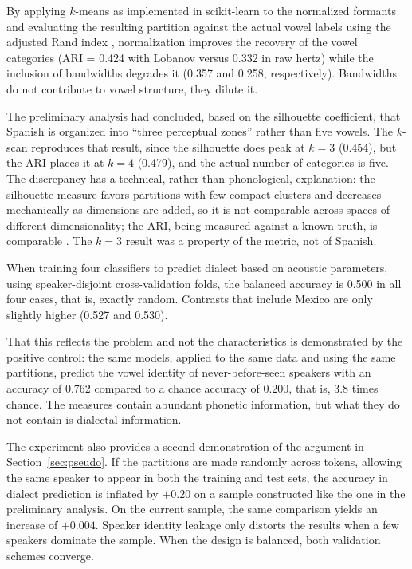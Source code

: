 \documentclass[11pt]{article}
\begin{document}
By applying $k$-means as implemented in scikit-learn \citep{pedregosa2011} to the
normalized formants and evaluating the resulting partition against the actual
vowel labels using the adjusted Rand index \citep{hubert1985}, normalization
improves the recovery of the vowel categories (ARI = 0.424 with Lobanov versus
0.332 in raw hertz) while the inclusion of bandwidths degrades it (0.357 and
0.258, respectively). Bandwidths do not contribute to vowel structure, they
dilute it.

The preliminary analysis had concluded, based on the silhouette coefficient, that
Spanish is organized into ``three perceptual zones'' rather than five vowels. The
$k$-scan reproduces that result, since the silhouette does peak at $k = 3$
(0.454), but the ARI places it at $k = 4$ (0.479), and the actual number of
categories is five. The discrepancy has a technical, rather than phonological, explanation:
the silhouette measure favors partitions with few compact clusters and decreases
mechanically as dimensions are added, so it is not comparable across spaces of
different dimensionality; the ARI, being measured against a known truth, is
comparable \citep{rousseeuw1987}. The $k = 3$ result was a property of the metric,
not of Spanish.

When training four classifiers to predict dialect based on acoustic parameters,
using speaker-disjoint cross-validation folds, the balanced accuracy is 0.500 in
all four cases, that is, exactly random. Contrasts that include Mexico are only
slightly higher (0.527 and 0.530).

That this reflects the problem and not the characteristics is demonstrated by the
positive control: the same models, applied to the same data and using the same
partitions, predict the vowel identity of never-before-seen speakers with an
accuracy of 0.762 compared to a chance accuracy of 0.200, that is, 3.8 times
chance. The measures contain abundant phonetic information, but what they do not
contain is dialectal information.

The experiment also provides a second demonstration of the argument in
Section~\ref{sec:pseudo}. If the partitions are made randomly across tokens,
allowing the same speaker to appear in both the training and test sets, the
accuracy in dialect prediction is inflated by $+0.20$ on a sample constructed
like the one in the preliminary analysis. On the current sample, the same
comparison yields an increase of $+0.004$. Speaker identity leakage only distorts
the results when a few speakers dominate the sample. When the design is balanced,
both validation schemes converge.
\end{document}
